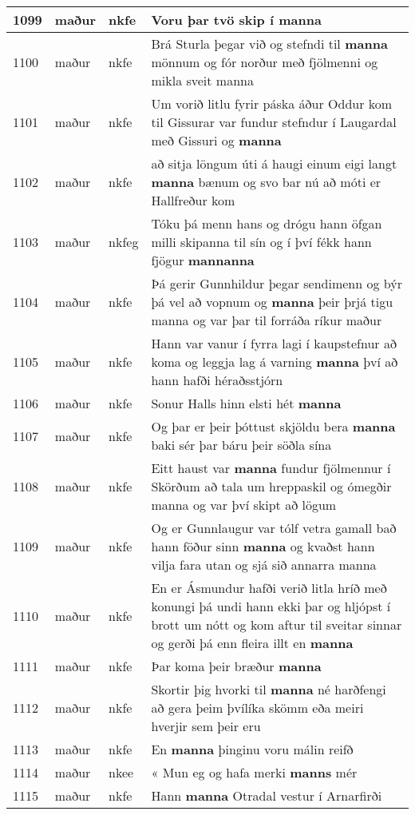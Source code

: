\documentclass{article}
\begin{document}
\begin{longtable}{p{1cm}|p{1cm}|p{1cm}|p{13cm}}
\hline
1099&maður&nkfe&Voru þar tvö skip í \textbf{manna} \\
\hline
1100&maður&nkfe&Brá Sturla þegar við og stefndi til \textbf{manna} mönnum og fór norður með fjölmenni og mikla sveit manna\\
\hline
1101&maður&nkfe&Um vorið litlu fyrir páska áður Oddur kom til Gissurar var fundur stefndur í Laugardal með Gissuri og \textbf{manna} \\
\hline
1102&maður&nkfe&að sitja löngum úti á haugi einum eigi langt \textbf{manna} bænum og svo bar nú að móti er Hallfreður kom\\
\hline
1103&maður&nkfeg&Tóku þá menn hans og drógu hann öfgan milli skipanna til sín og í því fékk hann fjögur \textbf{mannanna} \\
\hline
1104&maður&nkfe&Þá gerir Gunnhildur þegar sendimenn og býr þá vel að vopnum og \textbf{manna} þeir þrjá tigu manna og var þar til forráða ríkur maður\\
\hline
1105&maður&nkfe&Hann var vanur í fyrra lagi í kaupstefnur að koma og leggja lag á varning \textbf{manna} því að hann hafði héraðsstjórn\\
\hline
1106&maður&nkfe&Sonur Halls hinn elsti hét \textbf{manna} \\
\hline
1107&maður&nkfe&Og þar er þeir þóttust skjöldu bera \textbf{manna} baki sér þar báru þeir söðla sína\\
\hline
1108&maður&nkfe&Eitt haust var \textbf{manna} fundur fjölmennur í Skörðum að tala um hreppaskil og ómegðir manna og var því skipt að lögum\\
\hline
1109&maður&nkfe&Og er Gunnlaugur var tólf vetra gamall bað hann föður sinn \textbf{manna} og kvaðst hann vilja fara utan og sjá sið annarra manna\\
\hline
1110&maður&nkfe&En er Ásmundur hafði verið litla hríð með konungi þá undi hann ekki þar og hljópst í brott um nótt og kom aftur til sveitar sinnar og gerði þá enn fleira illt en \textbf{manna} \\
\hline
1111&maður&nkfe&Þar koma þeir bræður \textbf{manna} \\
\hline
1112&maður&nkfe&Skortir þig hvorki til \textbf{manna} né harðfengi að gera þeim þvílíka skömm eða meiri hverjir sem þeir eru\\
\hline
1113&maður&nkfe&En \textbf{manna} þinginu voru málin reifð\\
\hline
1114&maður&nkee&« Mun eg og hafa merki \textbf{manns} mér\\
\hline
1115&maður&nkfe&Hann \textbf{manna} Otradal vestur í Arnarfirði\\

\end{longtable}
\end{document}
